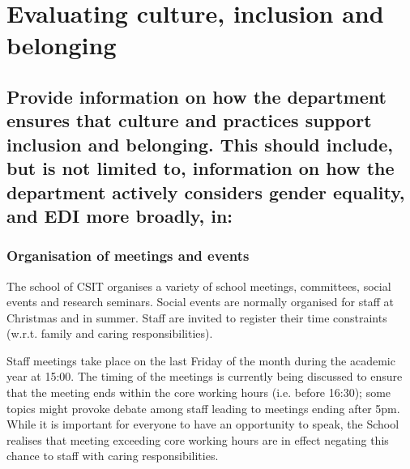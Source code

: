 
\clearpage

\section{Evaluating culture, inclusion and belonging}
\label{sec:culture}

\subsection{Provide information on how the department ensures that culture and practices support inclusion and belonging. This should include, but is not limited to, information on how the department actively considers gender equality, and EDI more broadly, in:} 

\subsubsection{Organisation of meetings and events}
The school of CSIT organises a variety of school meetings, committees, social events and research seminars. %
Social events are normally organised for staff at Christmas and in summer. Staff are invited to register their time constraints  (w.r.t. family and caring responsibilities). 

Staff meetings take place on the last Friday of the month during the academic year at 15:00. The timing of the meetings is currently being discussed to ensure that the meeting ends within the core working hours (i.e. before 16:30); some topics might provoke debate among staff leading to meetings ending after 5pm. While it is important for everyone to have an opportunity to speak, the School realises that meeting exceeding core working hours are in effect negating this chance to staff with caring responsibilities.

